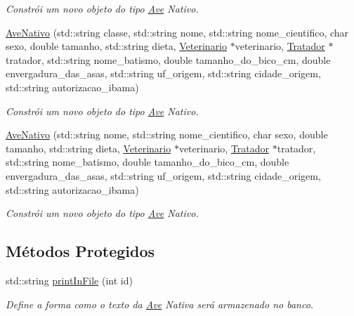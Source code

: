 \begin{DoxyCompactItemize}
\begin{DoxyCompactList}\small\item\em Constrói um novo objeto do tipo \hyperlink{classAve}{Ave} Nativo. \end{DoxyCompactList}\item 
\hyperlink{classAveNativo_aebc9f0533ed3b97268334e3a0217673c}{Ave\+Nativo} (std\+::string classe, std\+::string nome, std\+::string nome\+\_\+cientifico, char sexo, double tamanho, std\+::string dieta, \hyperlink{classVeterinario}{Veterinario} $\ast$veterinario, \hyperlink{classTratador}{Tratador} $\ast$tratador, std\+::string nome\+\_\+batismo, double tamanho\+\_\+do\+\_\+bico\+\_\+cm, double envergadura\+\_\+das\+\_\+asas, std\+::string uf\+\_\+origem, std\+::string cidade\+\_\+origem, std\+::string autorizacao\+\_\+ibama)
\begin{DoxyCompactList}\small\item\em Constrói um novo objeto do tipo \hyperlink{classAve}{Ave} Nativo. \end{DoxyCompactList}\item 
\hyperlink{classAveNativo_a53fbea0153ec7680a1a6ab3611afc663}{Ave\+Nativo} (std\+::string nome, std\+::string nome\+\_\+cientifico, char sexo, double tamanho, std\+::string dieta, \hyperlink{classVeterinario}{Veterinario} $\ast$veterinario, \hyperlink{classTratador}{Tratador} $\ast$tratador, std\+::string nome\+\_\+batismo, double tamanho\+\_\+do\+\_\+bico\+\_\+cm, double envergadura\+\_\+das\+\_\+asas, std\+::string uf\+\_\+origem, std\+::string cidade\+\_\+origem, std\+::string autorizacao\+\_\+ibama)
\begin{DoxyCompactList}\small\item\em Constrói um novo objeto do tipo \hyperlink{classAve}{Ave} Nativo. \end{DoxyCompactList}\end{DoxyCompactItemize}
\subsection*{Métodos Protegidos}
\begin{DoxyCompactItemize}
\item 
std\+::string \hyperlink{classAveNativo_ab95679ed20354b2183706db24899d316}{print\+In\+File} (int id)
\begin{DoxyCompactList}\small\item\em Define a forma como o texto da \hyperlink{classAve}{Ave} Nativa será armazenado no banco. \end{DoxyCompactList}\end{DoxyCompactItemize}
